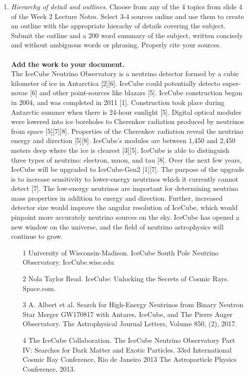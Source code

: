 \documentclass{article}
\begin{document}
\begin{enumerate}
\item \textit{Hierarchy of detail and outlines}.  Choose from any of the 4 topics from slide 4 of the Week 2 Lecture Notes.  Select 3-4 sources online and use them to create an outline with the appropriate hierachy of details covering the subject.  Submit the outline and a 200 word summary of the subject, written concisely and without ambiguous words or phrasing. Properly cite your sources. \\ \\
\textbf{Add the work to your document.} \\
The IceCube Neutrino Observatory is a neutrino detector formed by a cubic kilometer of ice in Antarctica [2][6]. IceCube could potentially detecto super-novae [6] and other point-sources like blazars [5].  IceCube construction began in 2004, and was completed in 2011 [1]. Construction took place during Antarctic summer when there is 24-hour sunlight [5].  Digital optical modules were lowered into ice boreholes to Cherenkov radiation produced by neutrinos from space [5][7][8]. Properties of the Cherenkov radiation reveal the neutrino energy and direction [5][8]. IceCube’s modules are between 1,450 and 2,450 meters deep where the ice is clearest [3][5]. IceCube is able to distinguish three types of neutrino: electron, muon, and tau [8].  Over the next few years, IceCube will be upgraded to IceCube-Gen2 [1][7]. The purpose of the upgrade is to increase sensitivity to lower-energy neutrinos which it currently cannot detect [7]. The low-energy neutrinos are important for determining neutrino mass properties in addition to energy and direction. Further, increased detector size would improve the angular resolution of IceCube, which would pinpoint more accurately neutrino sources on the sky.  IceCube has opened a new window on the universe, and the field of neutrino astrophysics will continue to grow.
\begin{itemize}
\item [1] University of Wisconsin-Madison. IceCube South Pole Neutrino Observatory. IceCube.wise.edu
\item [2] Nola Taylor Read. IceCube: Unlocking the Secrets of Cosmic Rays. Space.com. 
\item [3] A. Albert et al. Search for High-Energy Neutrinos from Binary Neutron Star Merger GW170817 with Antares, IceCube, and The Pierre Auger Observatory. The Astrophysical Journal Letters, Volume 850, (2), 2017. 
\item [4] The IceCube Collaboration. The IceCube Neutrino Observatory Part IV: Searches for Dark Matter and Exotic Particles. 33rd International Cosmic Ray Conference, Rio de Janeiro 2013 The Astroparticle Physics Conference, 2013. 

\end{itemize}
\end{enumerate}
\end{document}
